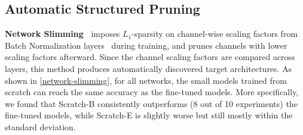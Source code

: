 \subsection{Automatic Structured Pruning}



\textbf{Network Slimming~\cite{liu2017learning}}
 imposes $L_1$-sparsity on channel-wise scaling factors from Batch Normalization layers~\cite{bn} during training, and prunes channels with lower scaling factors afterward. Since the channel scaling factors are compared across layers, this method produces automatically discovered target architectures. As shown in \autoref{network-slimming}, for all networks, the small models trained from scratch can reach the same accuracy as the fine-tuned models. More specifically, we found that Scratch-B consistently outperforms (8 out of 10 experiments) the fine-tuned models, while Scratch-E is slightly worse but still mostly within the standard deviation.
 

